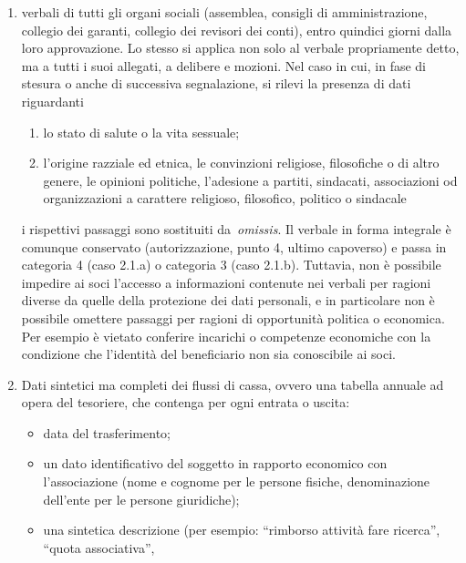 \begin{enumerate}
    \item
        verbali di tutti gli organi sociali (assemblea, consigli di
        amministrazione, collegio dei garanti, collegio dei revisori dei
        conti), entro quindici giorni dalla loro approvazione. Lo stesso si
        applica non solo al verbale propriamente detto, ma a tutti i suoi
        allegati, a delibere e mozioni. Nel caso in cui, in fase di stesura
        o anche di successiva segnalazione, si rilevi la presenza di dati
        riguardanti
        \begin{enumerate}
            \item lo stato di salute o la vita sessuale;
            \item l'origine razziale ed etnica, le
                convinzioni religiose, filosofiche o di altro genere, le opinioni
                politiche, l'adesione a partiti, sindacati, associazioni od
                organizzazioni a carattere religioso, filosofico, politico o
                sindacale
        \end{enumerate}
        i rispettivi passaggi sono sostituiti da~\emph{omissis}. Il verbale in
        forma integrale è comunque conservato (autorizzazione, punto 4, ultimo
        capoverso) e passa in categoria 4 (caso 2.1.a) o categoria 3 (caso
        2.1.b). Tuttavia, non è possibile impedire ai soci l'accesso a
        informazioni contenute nei verbali per ragioni diverse da quelle
        della protezione dei dati personali, e in particolare non è
        possibile omettere passaggi per ragioni di opportunità politica o
        economica. Per esempio è vietato conferire incarichi o competenze
        economiche con la condizione che l'identità del beneficiario non sia
        conoscibile ai soci.
    \item
        Dati sintetici ma completi dei flussi di cassa, ovvero una tabella
        annuale ad opera del tesoriere, che contenga per ogni entrata o uscita:
        \begin{itemize}
            \item data del trasferimento;
            \item un dato identificativo del soggetto in rapporto economico
                con l'associazione (nome e cognome per le persone fisiche,
                denominazione dell'ente per le persone giuridiche);
            \item una sintetica descrizione (per esempio: ``rimborso
                attività fare ricerca'', ``quota associativa'',

\end{itemize}
\end{enumerate}
